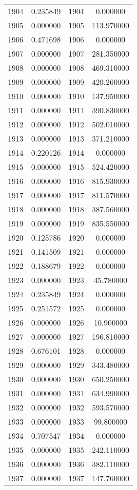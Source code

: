 \documentclass[12pt]{article}
\begin{document}
\begin{longtable}{@{}cccc@{}}
1904 & 0.235849 & 1904 & 0.000000 \\
1905 & 0.000000 & 1905 & 113.970000 \\
1906 & 0.471698 & 1906 & 0.000000 \\
1907 & 0.000000 & 1907 & 281.350000 \\
1908 & 0.000000 & 1908 & 469.310000 \\
1909 & 0.000000 & 1909 & 420.260000 \\
1910 & 0.000000 & 1910 & 137.950000 \\
1911 & 0.000000 & 1911 & 390.830000 \\
1912 & 0.000000 & 1912 & 502.010000 \\
1913 & 0.000000 & 1913 & 371.210000 \\
1914 & 0.220126 & 1914 & 0.000000 \\
1915 & 0.000000 & 1915 & 524.420000 \\
1916 & 0.000000 & 1916 & 815.930000 \\
1917 & 0.000000 & 1917 & 811.570000 \\
1918 & 0.000000 & 1918 & 387.560000 \\
1919 & 0.000000 & 1919 & 835.550000 \\
1920 & 0.125786 & 1920 & 0.000000 \\
1921 & 0.141509 & 1921 & 0.000000 \\
1922 & 0.188679 & 1922 & 0.000000 \\
1923 & 0.000000 & 1923 & 45.780000 \\
1924 & 0.235849 & 1924 & 0.000000 \\
1925 & 0.251572 & 1925 & 0.000000 \\
1926 & 0.000000 & 1926 & 10.900000 \\
1927 & 0.000000 & 1927 & 196.810000 \\
1928 & 0.676101 & 1928 & 0.000000 \\
1929 & 0.000000 & 1929 & 343.480000 \\
1930 & 0.000000 & 1930 & 650.250000 \\
1931 & 0.000000 & 1931 & 634.990000 \\
1932 & 0.000000 & 1932 & 593.570000 \\
1933 & 0.000000 & 1933 & 99.800000 \\
1934 & 0.707547 & 1934 & 0.000000 \\
1935 & 0.000000 & 1935 & 242.110000 \\
1936 & 0.000000 & 1936 & 382.110000 \\
1937 & 0.000000 & 1937 & 147.760000 \\

\end{longtable}
\end{document}
